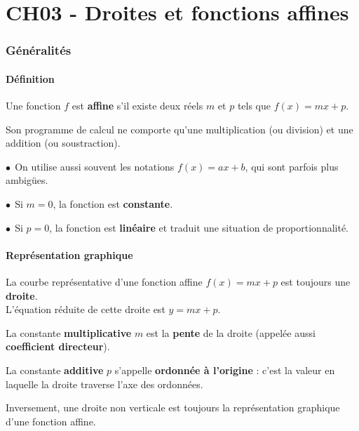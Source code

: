 \documentclass[a4paper,11pt]{article}
\author{Pierquet}
\title{\nomfichier}
\begin{document}
\pagestyle{fancy}

\part{CH03 - Droites et fonctions affines}

\section{Généralités}

\subsection{Définition}

\begin{cdefi}
Une fonction $f$ est \textbf{affine} s'il existe deux réels $m$ et $p$ tels que $f(x)=mx+p$.

Son programme de calcul ne comporte qu'une multiplication (ou division) et une addition (ou soustraction).
\end{cdefi}

\begin{crmq}[s]
$\bullet~~$On utilise aussi souvent les notations $f(x)=ax+b$, qui sont parfois plus ambigües.

$\bullet~~$Si $m=0$, la fonction est \textbf{constante}.

$\bullet~~$Si $p=0$, la fonction est \textbf{linéaire} et traduit une situation de proportionnalité.
\end{crmq}

\subsection{Représentation graphique}

\begin{cprop}
La courbe représentative d'une fonction affine $f(x)=mx+p$ est toujours une \textbf{droite}.\\ L'équation réduite de cette droite est $y=mx+p$.

La constante \textbf{multiplicative} $m$ est la \textbf{pente} de la droite (appelée aussi \textbf{coefficient directeur}).

La constante \textbf{additive} $p$ s'appelle \textbf{ordonnée à l'origine} : c'est la valeur en laquelle la droite traverse l'axe des ordonnées.
\end{cprop}

\begin{crmq}
Inversement, une droite non verticale est toujours la représentation graphique d'une fonction affine.
\end{crmq}
\end{document}
